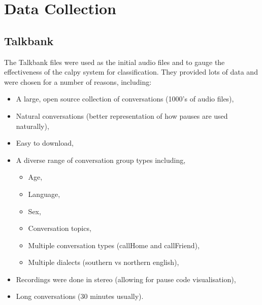 \section{Data Collection}
\subsection{Talkbank}
The Talkbank files were used as the initial audio files and to gauge the effectiveness of the calpy system for classification. They provided lots of data and were chosen for a number of reasons, including:
%
%
\begin{itemize}
	\item A large, open source collection of conversations (1000's of audio files),
	\item Natural conversations (better representation of how pauses are used naturally),
	\item Easy to download,
	\item A diverse range of conversation group types including,
		\begin{itemize}
			\item Age,
			\item Language,
			\item Sex,
			\item Conversation topics,
			\item Multiple conversation types (callHome and callFriend),
			\item Multiple dialects (southern vs northern english),
		\end{itemize}
	\item Recordings were done in stereo (allowing for pause code visualisation),
	\item Long conversations (30 minutes usually).
\end{itemize}

